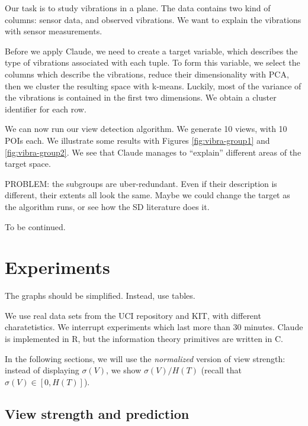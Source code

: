 Our task is to study vibrations in a plane. The data contains two kind of
columns: sensor data, and observed vibrations. We want to explain the
vibrations with sensor measurements.

Before we apply Claude, we need to create a target variable, which describes
the type of vibrations associated with each tuple. To form this variable, we
select the columns which describe the vibrations, reduce their dimensionality
with PCA, then we cluster the resulting space with k-means. Luckily, most of
the variance of the vibrations is contained in the first two dimensions. We
obtain a cluster identifier for each row.

We can now run our view detection algorithm. We generate 10 views, with 10 POIs
each. We illustrate some results with Figures \ref{fig:vibra-group1} and
\ref{fig:vibra-group2}. We see that Claude manages to ``explain'' different
areas of the target space.

PROBLEM: the subgroups are uber-redundant. Even if their description is
different, their extents all look the same. Maybe we could change the target
as the algorithm runs, or see how the SD literature does it.

To be continued.

\section{Experiments}

{\color{red}
The graphs should be simplified. Instead, use tables.
}

We use real data sets from the UCI repository and KIT, with different
charatetistics. We interrupt experiments which last more than 30 minutes.
Claude is implemented in R, but the information theory primitives are written
in C.

In the following sections, we will use the \emph{normalized} version of view
strength: instead of displaying $\sigma(V)$, we show $\sigma(V) / H(T)$ (recall
that $\sigma(V) \in [0, H(T) ]$).

\subsection{View strength and prediction}

